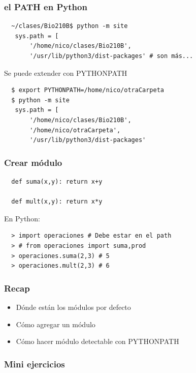 \documentclass[14pt,aspectratio=169,xcolor=dvipsnames]{beamer}
\begin{document}
\begin{frame}[fragile]\frametitle{el PATH en Python}
    \begin{verbatim}
  ~/clases/Bio210B$ python -m site
   sys.path = [
       '/home/nico/clases/Bio210B',
       '/usr/lib/python3/dist-packages' # son más...
    \end{verbatim}

    \pause Se puede extender con PYTHONPATH
    \begin{verbatim}
  $ export PYTHONPATH=/home/nico/otraCarpeta
  $ python -m site
   sys.path = [
       '/home/nico/clases/Bio210B',
       '/home/nico/otraCarpeta',
       '/usr/lib/python3/dist-packages'
    \end{verbatim}

\end{frame}
\begin{frame}[fragile]\frametitle{Crear módulo}
    \begin{verbatim}
  def suma(x,y): return x+y

  def mult(x,y): return x*y
    \end{verbatim}

  En Python:
  \begin{verbatim}
  > import operaciones # Debe estar en el path
  > # from operaciones import suma,prod
  > operaciones.suma(2,3) # 5
  > operaciones.mult(2,3) # 6
  \end{verbatim}
\end{frame}
\begin{frame}\frametitle{Recap}
    \begin{itemize}
        \item Dónde están los módulos por defecto
        \item Cómo agregar un módulo
        \item Cómo hacer módulo detectable con PYTHONPATH
    \end{itemize}
\end{frame}
\begin{frame}
    \maketitle
\end{frame}
\begin{frame}[fragile]\frametitle{Mini ejercicios}
\end{frame}
\end{document}
